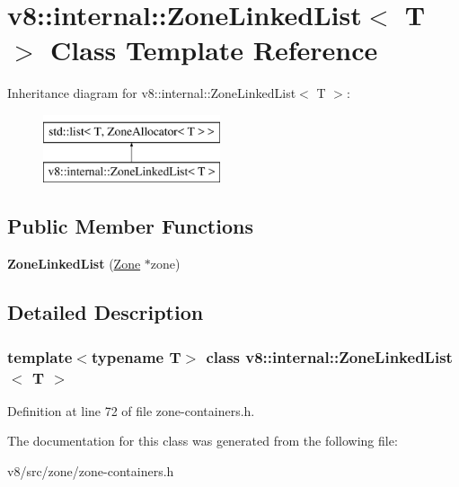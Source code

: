 \hypertarget{classv8_1_1internal_1_1ZoneLinkedList}{}\section{v8\+:\+:internal\+:\+:Zone\+Linked\+List$<$ T $>$ Class Template Reference}
\label{classv8_1_1internal_1_1ZoneLinkedList}
Inheritance diagram for v8\+:\+:internal\+:\+:Zone\+Linked\+List$<$ T $>$\+:\begin{figure}[H]
\begin{center}
\leavevmode
\includegraphics[height=2.000000cm]{classv8_1_1internal_1_1ZoneLinkedList}
\end{center}
\end{figure}
\subsection*{Public Member Functions}
\begin{DoxyCompactItemize}
\item 
\mbox{\label{classv8_1_1internal_1_1ZoneLinkedList_aee153eb9aeca187ed7fd186943049462}} 
{\bfseries Zone\+Linked\+List} (\mbox{\hyperlink{classv8_1_1internal_1_1Zone}{Zone}} $\ast$zone)
\end{DoxyCompactItemize}


\subsection{Detailed Description}
\subsubsection*{template$<$typename T$>$\newline
class v8\+::internal\+::\+Zone\+Linked\+List$<$ T $>$}



Definition at line 72 of file zone-\/containers.\+h.



The documentation for this class was generated from the following file\+:\begin{DoxyCompactItemize}
\item 
v8/src/zone/zone-\/containers.\+h\end{DoxyCompactItemize}
